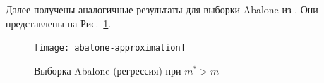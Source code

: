 Далее получены аналогичные результаты для выборки Abalone из \citep{UCI}. Они представлены на Рис.~\ref{abalone-approximation}.

\begin{figure}[h!]
    \centering
    \texttt{[image: abalone-approximation]}
    \caption{Выборка Abalone (регрессия) при $m^* > m$}
    \label{abalone-approximation}
\end{figure}